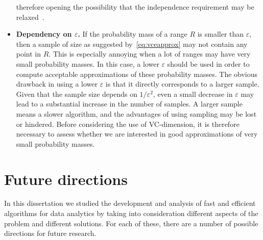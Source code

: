 \begin{itemize}
    therefore opening the possibility that the independence requirement may be
    relaxed~\citep{Catoni04,AdamsN11,AdamsN13,VanHandel13}.
  \item{\bf Dependency on $\varepsilon$.} If the probability mass of a range $R$ is
    smaller than $\varepsilon$, then a sample of size as suggested
    by~\eqref{eq:vceapprox} may not contain any point in $R$. This is especially annoying when a lot
    of ranges may have very small probability masses. In this case, a lower
    $\varepsilon$ should be used in order to compute acceptable approximations
    of these probability masses. The obvious drawback in using a lower
    $\varepsilon$ is that it directly corresponds to a larger sample. Given that
    the sample size depends on $1/\varepsilon^2$, even a small decrease in
    $\varepsilon$ may lead to a substantial increase in the number of samples. A larger
    sample means a slower algorithm, and the advantages of using sampling may be
    lost or hindered. Before considering the use of VC-dimension, it is therefore
    necessary to assess whether we are interested in good approximations of very
    small probability masses. 
\end{itemize}

\section*{Future directions} 
In this dissertation we studied the development and analysis of fast and
efficient algorithms for data analytics by taking into consideration different
aspects of the problem and different solutions. For each of these, there are a
number of possible directions for future research.

